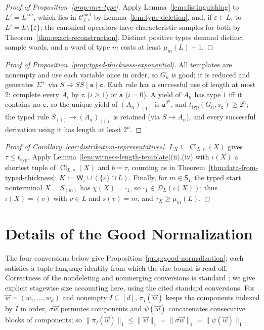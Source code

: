 \documentclass[11pt]{article}
\numberwithin{equation}{section}
\theoremstyle{plain}
\theoremstyle{definition}
\theoremstyle{remark}
\newcommand{\Wit}{\mathsf{W}}
\newcommand{\Cmcf}[2]{\mathcal{C}^{\mathrm{mcf}}_{#1,#2}}
\newcommand{\D}{\mathcal{D}}
\newcommand{\tuple}[1]{\vec{#1}}
\newcommand{\blank}{\square}
\newcommand{\eps}{\varepsilon}
\theoremstyle{plain}
\begin{document}
\begin{proof}[Proof of Proposition~\ref{prop:rare-type}]
Apply Lemma~\ref{lem:distinguishing} to $L'=L^{\setminus m}$, which lies in
$\Cmcf{f}{s}$ by Lemma~\ref{lem:type-deletion}, and, if $\eps\in L$, to
$L'=L\setminus\{\eps\}$; the canonical operators have characteristic samples for
both by Theorem~\ref{thm:exact-reconstruction}.  Distinct positive types demand
distinct sample words, and a word of type $m$ costs at least $\mu_m(L)+1$.
\end{proof}

\begin{proof}[Proof of Proposition~\ref{prop:typed-thickness-exponential}]
All templates are nonempty and use each variable once in order, so $G_n$ is
good; it is reduced and generates $\Sigma^+$ via $S\to SS\mid\mathtt a\mid\mathtt c$.
Each rule has a successful use of length at most $2$: complete every $A_i$ by
$\mathtt c$ ($i\ge1$) or $\mathtt a$ ($i=0$).  A yield of $A_n$ has type $1$ iff it
contains no $\mathtt c$, so the unique yield of $(A_n)_{(1)}$ is $\mathtt a^{2^n}$,
and $t_{\mathrm{typ}}(G_n,s_{\mathtt c})\ge2^n$; the typed rule
$S_{(1)}\to(A_n)_{(1)}$ is retained (via $S\to A_n$), and every successful
derivation using it has length at least $2^n$.
\end{proof}

\begin{proof}[Proof of Corollary~\ref{cor:distribution-representatives}]
$L_X\subseteq\operatorname{Cl}_{L,s}(X)$ gives $\tau\le t_{\mathrm{typ}}$.  Apply
Lemma~\ref{lem:witness-length-template}(ii),(iv) with $\iota(X)$ a shortest tuple of
$\operatorname{Cl}_{L,s}(X)$ and $b=\tau$, counting as in
Theorem~\ref{thm:data-from-typed-thickness}; $K:=\Wit_\iota\cup(\{\eps\}\cap L)$.
Finally, for $m\in \mathsf S_L$ the typed start nonterminal $X=S_{(m)}$ has
$\chi(X)=\blank_1$, so $\blank_1\in\D_L(\iota(X))$; thus $\iota(X)=(v)$ with
$v\in L$ and $s(v)=m$, and $\tau_X\ge\mu_m(L)$.
\end{proof}

\section{Details of the Good Normalization}
\label{app:normalization-details}

The four conversions below give Proposition~\ref{prop:good-normalization}; each satisfies
a tuple-language identity from which the size bound is read off.  Correctness of the
nondeleting and nonmerging conversions is standard
\cite{SekiEtAl1991,Kanazawa2019Ogden,Yoshinaka2011}; we give explicit stagewise
size accounting here, using the cited standard conversions.  For
$\tuple w=(w_1,\ldots,w_d)$ and nonempty $I\subseteq[d]$, $\pi_I(\tuple w)$ keeps the
components indexed by $I$ in order, $\sigma\tuple w$ permutes components and
$\psi(\tuple w)$ concatenates consecutive blocks of components; so
$\|\pi_I(\tuple w)\|_1\le\|\tuple w\|_1=\|\sigma\tuple w\|_1=\|\psi(\tuple w)\|_1$.
\end{document}
